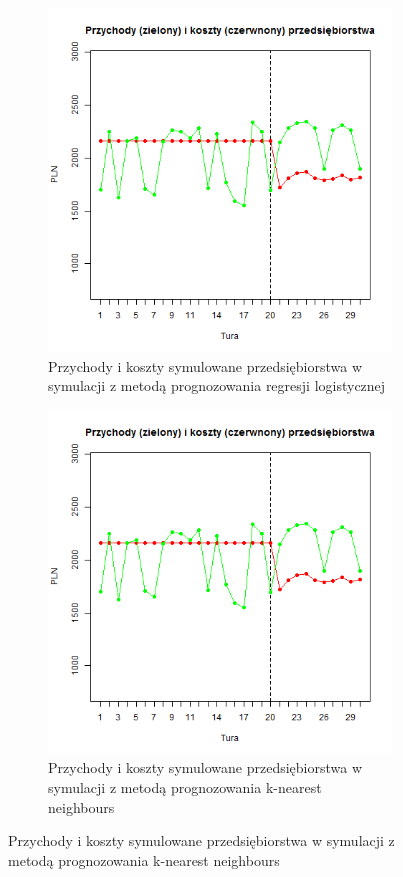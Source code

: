 \documentclass[polish, twoside, 12pt, a4paper]{article}
\theoremstyle{definition}
\theoremstyle{plain}
\theoremstyle{remark}
\begin{document}
\begin{figure}[hbt]
  \centering
  \begin{subfigure}[t]{0.45\textwidth}
    \includegraphics[width=\textwidth]{pictures/przychody_koszty_lm.png}
    \caption{Przychody i koszty symulowane przedsiębiorstwa w symulacji z metodą prognozowania regresji logistycznej}
    \label{fig:przychod_koszt}
  \end{subfigure}
  \hfill
  \begin{subfigure}[t]{0.45\textwidth}

    \includegraphics[width=\textwidth]{pictures/przcyhody_koszty_kn.png}
    \caption{Przychody i koszty symulowane przedsiębiorstwa w symulacji z metodą prognozowania k-nearest neighbours}
    \label{fig:zysk}
  \end{subfigure}
  

\end{figure}
\end{document}

